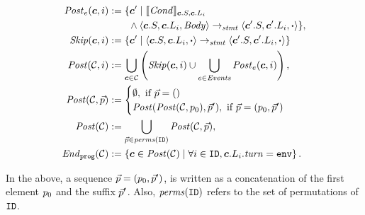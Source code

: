 \begin{mdframed}[
    skipabove=5pt, skipbelow=5pt,
    innertopmargin=0pt,
    innerleftmargin=0pt, innerrightmargin=0pt
]
\footnotesize
\newcommand{\Skip}{\mathit{Skip}\xspace}
\begin{align*}
    \Post_\Ev(\gconfig,i) &:= \{ \gconfig' \mid \eec{\EvCond}{\gconfig.S, \gconfig.\lconfig{i}} \\
      & \ \ \ \ \ \ \land \left\langle \gconfig.S, \gconfig.\lconfig{i}, \EvBody \right\rangle \stmtrule \left\langle \gconfig'.S, \gconfig'.\lconfig{i}, \EndEvent \right\rangle\}, \\
    \Skip(\gconfig,i) &:= \{ \gconfig' \mid \left\langle \gconfig.S, \gconfig.\lconfig{i}, \EndEvent \right\rangle \stmtrule \left\langle \gconfig'.S, \gconfig'.\lconfig{i}, \EndEvent \right\rangle \} \\
    \Post(\gset,i) &:=  \bigcup_{\gconfig\in\gset} \left(\Skip(\gconfig, i) \cup \bigcup_{\Ev \in \Event} \Post_\Ev(\gconfig, i) \right),\\
    \Post(\gset,\pvec) &:= 
        \begin{cases}
            \emptyset, \text{ if } \pvec=()\\
            \Post(\Post(\gset,\pinit),\pvec'), \text{ if } \pvec=(\pinit, \pvec')\\
        \end{cases}\\
    \Post(\gset) &:=  \bigcup_{\pvec\in \mathit{perms}(\UINS)} \Post(\gset,\pvec), \\
    \Final(\gset) &:=  \left\{ \gconfig\in \Post(\gset)\mid \forall i \in \UINS, \gconfig.\lconfig{i}.\turn = \env \right\}.
\end{align*}
\end{mdframed}
In the above, a sequence $\vec{p}=(p_0, \vec{p}')$, is written  as a concatenation of the first element $p_0$ and the suffix $\vec{p}'$.
Also, $\mathit{perms}(\texttt{ID})$ refers to the set of permutations of $\texttt{ID}$.

